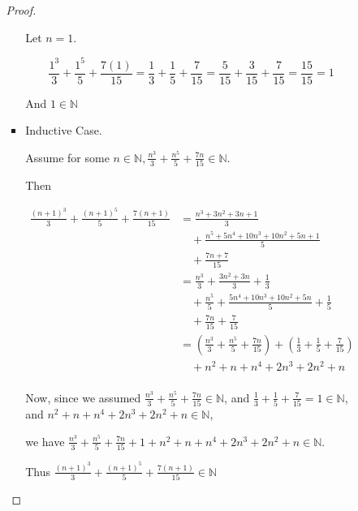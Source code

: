 \documentclass[12pt,letterpaper]{article}
\begin{document}
\begin{enumerate}
\begin{enumerate}
\begin{enumerate}
\begin{proof}
\begin{itemize}
                    Let $n = 1$.

                    \[
                      \frac{1^3}{3} + \frac{1^5}{5} + \frac{7\left(1\right)}{15} = \frac{1}{3} + \frac{1}{5} + \frac{7}{15}  = \frac{5}{15} + \frac{3}{15} + \frac{7}{15}  = \frac{15}{15}  = 1
                    \]

                    And $1 \in \mathbb{N}$
                  \item Inductive Case.

                    Assume for some $n \in \mathbb{N}, \frac{n^3}{3} + \frac{n^5}{5} + \frac{7n}{15} \in \mathbb{N}$.

                    Then

                    \begin{align*}
                      \frac{\left(n + 1\right)^3}{3} + \frac{\left(n + 1\right)^5}{5} + \frac{7\left(n + 1\right)}{15}
                      &= \frac{n^3 + 3n^2 + 3n + 1}{3} \\
                      &\quad+ \frac{n^5 + 5n^4 + 10n^3 + 10n^2 + 5n + 1}{5} \\
                      &\quad+ \frac{7n + 7}{15} \\
                      &= \frac{n^3}{3} + \frac{3n^2 + 3n}{3} + \frac{1}{3} \\
                      &\quad+ \frac{n^5}{5} + \frac{5n^4 + 10n^3 + 10n^2 + 5n}{5} + \frac{1}{5} \\
                      &\quad+ \frac{7n}{15} + \frac{7}{15} \\
                      &= \left(\frac{n^3}{3} + \frac{n^5}{5} + \frac{7n}{15}\right) + \left(\frac{1}{3} + \frac{1}{5} + \frac{7}{15}\right) \\
                      &\quad+ n^2 + n + n^4 + 2n^3 + 2n^2 + n \\
                    \end{align*}

                    Now, since we assumed $\frac{n^3}{3} + \frac{n^5}{5} + \frac{7n}{15} \in \mathbb{N}$,
                    and $\frac{1}{3} + \frac{1}{5} + \frac{7}{15} = 1 \in \mathbb{N}$, and $n^2 + n + n^4 + 2n^3 + 2n^2 + n \in \mathbb{N}$,

                    we have $\frac{n^3}{3} + \frac{n^5}{5} + \frac{7n}{15} + 1 + n^2 + n + n^4 + 2n^3 + 2n^2 + n \in \mathbb{N}$.

                    Thus $\frac{\left(n + 1\right)^3}{3} + \frac{\left(n + 1\right)^5}{5} + \frac{7\left(n + 1\right)}{15} \in \mathbb{N}$


\end{itemize}
\end{proof}
\end{enumerate}
\end{enumerate}
\end{enumerate}
\end{document}
